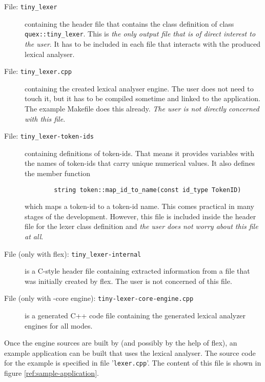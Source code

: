\begin{description}
\item[File: \tt tiny\_lexer] containing the header file that contains the class
  definition of class {\tt quex::tiny\_lexer}. This is {\it the only output file
  that is of direct interest to the user}. It has to be included in each file
  that interacts with the produced lexical analyser.

\item[File: \tt tiny\_lexer.cpp] containing the created lexical analyser
  engine. The user does not need to touch it, but it has to be compiled
  sometime and linked to the application. The example Makefile does this
  already. {\it The user is not directly concerned with this file}.
  
\item[File: \tt tiny\_lexer-token-ids] containing definitions of token-ids.
  That means it provides variables with the names of token-ids that carry
  unique numerical values. It also defines the member function
  
  \begin{lstlisting}
        string token::map_id_to_name(const id_type TokenID)
  \end{lstlisting}
  which maps a token-id to a token-id name. This comes practical in many
  stages of the development. However, this file is included inside the header
  file for the lexer class definition and {\it the user does not worry
    about this file at all}.
  
\item[File (only with flex): \tt tiny\_lexer-internal] is a C-style header file containing
  extracted information from a file that was initially created by flex. The
  user is not concerned of this file.

\item[File (only with {\quex}-core engine): \tt tiny-lexer-core-engine.cpp] is
  a generated C++ code file containing the generated lexical analyzer engines
  for all modes.  
\end{description}

Once the engine sources are built by {\quex} (and possibly by the help of flex), an
example application can be built that uses the lexical analyser.  The source
code for the example is specified in file '{\tt lexer.cpp}'. The content
of this file is shown in figure \ref{ref:sample-application}.

